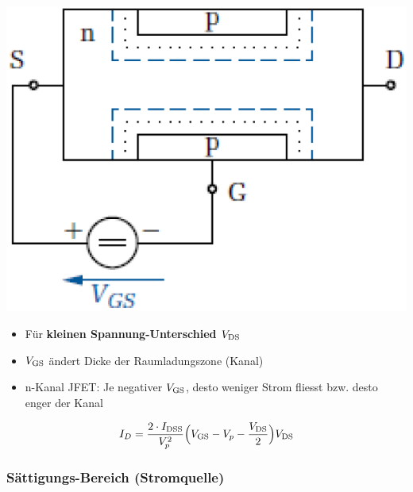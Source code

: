 \begin{minipage}[t]{0.3\columnwidth}
    \includegraphics[align=t, width=\columnwidth]{images/fet_aufbau_linearer_bereich.png}
\end{minipage}
\hfill
\begin{minipage}[t]{0.68\columnwidth}
    \begin{itemize}
        \item Für \textbf{kleinen Spannung-Unterschied $V_{\rm DS}$}
        \item $V_{\rm GS}$ ändert Dicke der Raumladungszone (Kanal)
        \item n-Kanal JFET: Je negativer $V_{\rm GS}$, desto weniger Strom fliesst bzw. desto enger der Kanal
    \end{itemize}

    $$  I_D = \frac{2 \cdot I_{\rm DSS}}{V_p^2} \Big( V_{\rm GS} - V_p - \frac{V_{\rm DS}}{2} \Big) V_{\rm DS} $$
\end{minipage}


\subsubsection{Sättigungs-Bereich (Stromquelle)}

